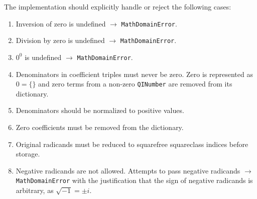 \documentclass[11pt]{article}
\begin{document}
The implementation should explicitly handle or reject the following cases:

\begin{enumerate}[label=\arabic*.]
  \item Inversion of zero is undefined $\to$ \texttt{MathDomainError}.
  \item Division by zero is undefined $\to$ \texttt{MathDomainError}.
  \item \(0^0\) is undefined $\to$ \texttt{MathDomainError}.
  \item Denominators in coefficient triples must never be zero. Zero is represented as $0 = \{\}$ and zero terms from a non-zero \texttt{QINumber} are removed from its dictionary.
  \item Denominators should be normalized to positive values.
  \item Zero coefficients must be removed from the dictionary.
  \item Original radicands must be reduced to squarefree squareclass indices before storage.
  \item Negative radicands are not allowed. Attempts to pass negative radicands $\to$ \texttt{MathDomainError} with the justification that the sign of negative radicands is arbitrary, as  $\sqrt{-1} = \pm i$.

\end{enumerate}
\end{document}
